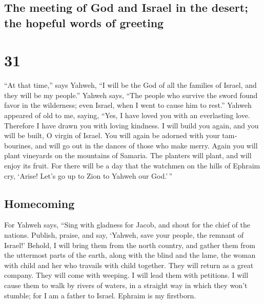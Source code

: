 \begin{paracol}{2}
\switchcolumn
\begin{otherlanguage}{english}

\hypertarget{the-meeting-of-god-and-israel-in-the-desert-the-hopeful-words-of-greeting}{%
\subsection{The meeting of God and Israel in the desert; the hopeful
words of
greeting}\label{the-meeting-of-god-and-israel-in-the-desert-the-hopeful-words-of-greeting}}

\hypertarget{section-61}{%
\section{31}\label{section-61}}

 ``At that time,'' says Yahweh, ``I will be the God of all
the families of Israel, and they will be my people.'' 
Yahweh says, ``The people who survive the sword found favor in the
wilderness; even Israel, when I went to cause him to rest.''
 Yahweh appeared of old to me, saying, ``Yes, I have loved
you with an everlasting love. Therefore I have drawn you with loving
kindness.  I will build you again, and you will be built,
O virgin of Israel. You will again be adorned with your tambourines, and
will go out in the dances of those who make merry.  Again
you will plant vineyards on the mountains of Samaria. The planters will
plant, and will enjoy its fruit.  For there will be a day
that the watchmen on the hills of Ephraim cry, `Arise! Let's go up to
Zion to Yahweh our God.'\,''

\hypertarget{homecoming}{%
\subsection{Homecoming}\label{homecoming}}

 For Yahweh says, ``Sing with gladness for Jacob, and
shout for the chief of the nations. Publish, praise, and say, `Yahweh,
save your people, the remnant of Israel!'  Behold, I will
bring them from the north country, and gather them from the uttermost
parts of the earth, along with the blind and the lame, the woman with
child and her who travails with child together. They will return as a
great company.  They will come with weeping. I will lead
them with petitions. I will cause them to walk by rivers of waters, in a
straight way in which they won't stumble; for I am a father to Israel.
Ephraim is my firstborn.


\end{otherlanguage}
\end{paracol}
